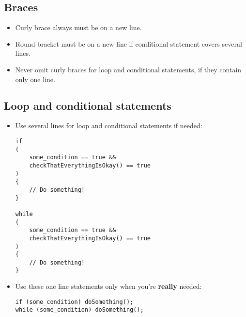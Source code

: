 \documentclass[12pt]{article}
\begin{document}
		\subsection{Braces}
			\begin{itemize}
				\item Curly brace always must be on a new line.
				\item Round bracket must be on a new line if conditional statement covers several lines.
				\item Never omit curly braces for loop and conditional statements, if they contain only one line.
			\end{itemize}

		\subsection{Loop and conditional statements}
			\begin{itemize}
				\item Use several lines for loop and conditional statements if needed:
					\begin{lstlisting}
if
(
	some_condition == true &&
	checkThatEverythingIsOkay() == true
)
{
	// Do something!
}

while
(
	some_condition == true &&
	checkThatEverythingIsOkay() == true
)
{
	// Do something!
}
					\end{lstlisting}
				\item Use these one line statements only when you're \textbf{really} needed:
\begin{lstlisting}
if (some_condition) doSomething();
while (some_condition) doSomething();
\end{lstlisting}
			\end{itemize}
\end{document}
